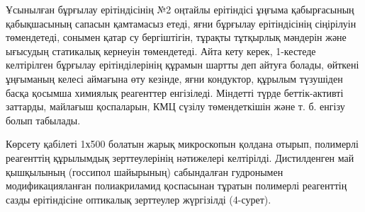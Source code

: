 
\begin{multicols}{2}
Ұсынылған бұрғылау ерітіндісінің №2 оңтайлы ерітіндісі ұңғыма
қабырғасының қабықшасының сапасын қамтамасыз етеді, яғни бұрғылау
ерітіндісінің сіңірілуін төмендетеді, сонымен қатар су бергіштігін,
тұрақты тұтқырлық мәндерін және ығысудың статикалық кернеуін
төмендетеді. Айта кету керек, 1-кестеде келтірілген бұрғылау
ерітінділерінің құрамын шартты деп айтуға болады, өйткені ұңғыманың
келесі аймағына өту кезінде, яғни кондуктор, құрылым түзушіден басқа
қосымша химиялық реагенттер енгізіледі. Міндетті түрде беттік-активті
заттарды, майлағыш қоспаларын, КМЦ сүзілу төмендеткішін және т. б.
енгізу болып табылады.

Көрсету қабілеті 1х500 болатын жарық микроскопын қолдана отырып,
полимерлі реагенттің құрылымдық зерттеулерінің нәтижелері келтірілді.
Дистилденген май қышқылының (госсипол шайырының) сабындалған гудронымен
модификацияланған полиакриламид қоспасынан тұратын полимерлі реагенттің
сазды ерітіндісіне оптикалық зерттеулер жүргізілді (4-сурет).
\end{multicols}

